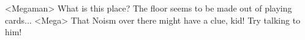 <Megaman> What is this place? The floor seems to be made out of playing cards... 
<Mega> That Noism over there might have a clue, kid! Try talking to him! 
